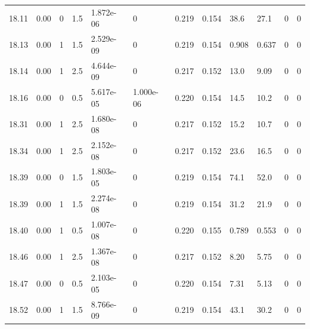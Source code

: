 \documentclass[preview]{standalone}
\begin{document}
{{{{{{{{\begin{tabular}{L{1.2cm}C{1.2cm} C{0.3cm}C{0.5cm} C{1.4cm}C{1.4cm} C{1.4cm}C{1.4cm} C{1.6cm}C{1.6cm} C{1.6cm}C{1.6cm}}
  18.11  &  0.00  & 0     & 1.5 &  1.872e-06  & 0  &  0.219&   0.154& 38.6 & 27.1   &  0 & 0  \\ 
  18.13  &  0.00  & 1     & 1.5 &  2.529e-09  & 0  &  0.219&   0.154& 0.908 & 0.637   &  0 & 0  \\ 
  18.14  &  0.00  & 1     & 2.5 &  4.644e-09  & 0  &  0.217&   0.152& 13.0 & 9.09   &  0 & 0  \\ 
  18.16  &  0.00  & 0     & 0.5 &  5.617e-05  & 1.000e-06  &  0.220&   0.154& 14.5 & 10.2   &  0 & 0  \\ 
  18.31  &  0.00  & 1     & 2.5 &  1.680e-08  & 0  &  0.217&   0.152& 15.2 & 10.7   &  0 & 0  \\ 
  18.34  &  0.00  & 1     & 2.5 &  2.152e-08  & 0  &  0.217&   0.152& 23.6 & 16.5   &  0 & 0  \\ 
  18.39  &  0.00  & 0     & 1.5 &  1.803e-05  & 0  &  0.219&   0.154& 74.1 & 52.0   &  0 & 0  \\ 
  18.39  &  0.00  & 1     & 1.5 &  2.274e-08  & 0  &  0.219&   0.154& 31.2 & 21.9   &  0 & 0  \\ 
  18.40  &  0.00  & 1     & 0.5 &  1.007e-08  & 0  &  0.220&   0.155& 0.789 & 0.553   &  0 & 0  \\ 
  18.46  &  0.00  & 1     & 2.5 &  1.367e-08  & 0  &  0.217&   0.152& 8.20 & 5.75   &  0 & 0  \\ 
  18.47  &  0.00  & 0     & 0.5 &  2.103e-05  & 0  &  0.220&   0.154& 7.31 & 5.13   &  0 & 0  \\ 
  18.52  &  0.00  & 1     & 1.5 &  8.766e-09  & 0  &  0.219&   0.154& 43.1 & 30.2   &  0 & 0  \\ 
\hline 
\end{tabular} 

}}}}}}}}
\end{document}
